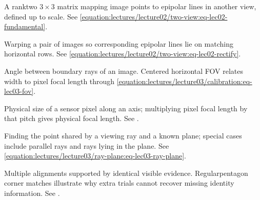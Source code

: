 \documentclass[letterpaper,11pt,english,openany,oneside]{jupyterBook}
\begin{document}
\begin{description}
\sphinxAtStartPar
A rank\sphinxhyphen{}two \(3\times3\) matrix mapping image points to epipolar lines in another view, defined up to scale. See \eqref{equation:lectures/lecture02/two-view:eq-lec02-fundamental}.

\sphinxAtStartPar
Warping a pair of images so corresponding epipolar lines lie on matching horizontal rows. See \eqref{equation:lectures/lecture02/two-view:eq-lec02-rectify}.

\sphinxAtStartPar
Angle between boundary rays of an image. Centered horizontal FOV relates width to pixel focal length through \eqref{equation:lectures/lecture03/calibration:eq-lec03-fov}.

\sphinxAtStartPar
Physical size of a sensor pixel along an axis; multiplying pixel focal length by that pitch gives physical focal length. See {\hyperref[\detokenize{lectures/lecture03/calibration:lec03-calibration}]{}}.

\sphinxAtStartPar
Finding the point shared by a viewing ray and a known plane; special cases include parallel rays and rays lying in the plane. See \eqref{equation:lectures/lecture03/ray-plane:eq-lec03-ray-plane}.

\sphinxAtStartPar
Multiple alignments supported by identical visible evidence. Regular\sphinxhyphen{}pentagon corner matches illustrate why extra trials cannot recover missing identity information. See {\hyperref[\detokenize{lectures/lecture03/probability-ransac:lec03-ransac-practice}]{}}.


\end{description}
\end{document}
